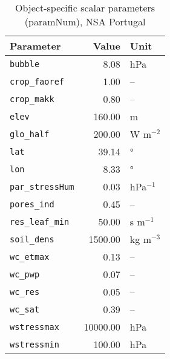 \begin{table}[ht]
\centering
\caption{Object-specific scalar parameters (\textsf{paramNum}), NSA Portugal} 
\label{tab:portugalNSA_paramNum}
\begin{tabular}{lrl}
  \hline
Parameter & Value & Unit \\ 
  \hline
\verb!bubble! & 8.08 & hPa \\ 
  \verb!crop_faoref! & 1.00 & -- \\ 
  \verb!crop_makk! & 0.80 & -- \\ 
  \verb!elev! & 160.00 & m \\ 
  \verb!glo_half! & 200.00 & W m$^{-2}$ \\ 
  \verb!lat! & 39.14 & ° \\ 
  \verb!lon! & 8.33 & ° \\ 
  \verb!par_stressHum! & 0.03 & hPa$^{-1}$ \\ 
  \verb!pores_ind! & 0.45 & -- \\ 
  \verb!res_leaf_min! & 50.00 & s m$^{-1}$ \\ 
  \verb!soil_dens! & 1500.00 & kg m$^{-3}$ \\ 
  \verb!wc_etmax! & 0.13 & -- \\ 
  \verb!wc_pwp! & 0.07 & -- \\ 
  \verb!wc_res! & 0.05 & -- \\ 
  \verb!wc_sat! & 0.39 & -- \\ 
  \verb!wstressmax! & 10000.00 & hPa \\ 
  \verb!wstressmin! & 100.00 & hPa \\ 
   \hline
\end{tabular}
\end{table}
